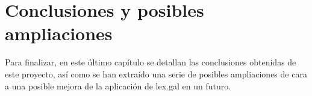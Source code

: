 \chapter{Conclusiones y posibles ampliaciones}

Para finalizar, en este último capítulo se detallan las conclusiones obtenidas de este proyecto, así como se han extraído una serie de posibles ampliaciones de cara a una posible mejora de la aplicación de lex.gal en un futuro.



